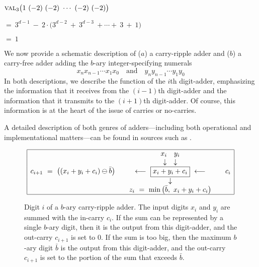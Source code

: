 \smallskip

$\displaystyle \mbox{\sc val}_3 \big( 1 \ (-2) \ (-2) \ \cdots \ (-2) \ (-2) \big)$

\smallskip

\hspace*{.25in}$= \ 3^{d-1} \ - \ 2 \cdot \big(3^{d-2} \ + \ 3^{d-3}
\ + \cdots + \ 3 \ + \ 1 \big)$

\hspace*{.25in}$= \ 1$

\bigskip

We now provide a schematic description of ($a$) a carry-ripple adder
and ($b$) a carry-free adder adding the $b$-ary integer-specifying
numerals
\[ x_n x_{n-1} \cdots x_1 x_0 \ \ \ \mbox{ and } \ \ \ 
y_n y_{n-1} \cdots y_1 y_0
\]
In both descriptions, we describe the function of the $i$th
digit-adder, emphasizing the information that it receives from the
$(i-1)$th digit-adder and the information that it transmits to the
$(i+1)$th digit-adder.  Of course, this information is at the heart of
the issue of carries or no-carries.

A detailed description of both genres of adders---including both
operational and implementational matters---can be found in sources
such as \cite{Hwang79}.

\begin{figure}[hbt]
\[
\begin{array}{|lcccr|}
\hline
 & & x_i \ \ \ y_i & & \\
 & & \downarrow \ \ \ \downarrow & & \\
c_{i+1} \ = \ \big( (x_i + y_i + c_i) \ominus \bar{b} \big)
 & & \longleftarrow \ \fbox{$x_i + y_i + c_i$} \ \longleftarrow & &  c_i 
  \\
 & & \downarrow & &
  \\
 & & z_i \ = \ \min \big( \bar{b}, \ x_i + y_i + c_i \big)  & & 
  \\
\hline
\end{array}
\]
\caption{Digit $i$ of a $b$-ary carry-ripple adder.  The input digits
  $x_i$ and $y_i$ are summed with the in-carry $c_i$.  If the sum can
  be represented by a single $b$-ary digit, then it is the output from
  this digit-adder, and the out-carry $c_{i+1}$ is set to $0$.  If the
  sum is too big, then the maximum $b$-ary digit $\bar{b}$ is the
  output from this digit-adder, and the out-carry $c_{i+1}$ is set to
  the portion of the sum that exceeds $\bar{b}$.}
\label{fig:carry-ripple-digit}
\end{figure}

